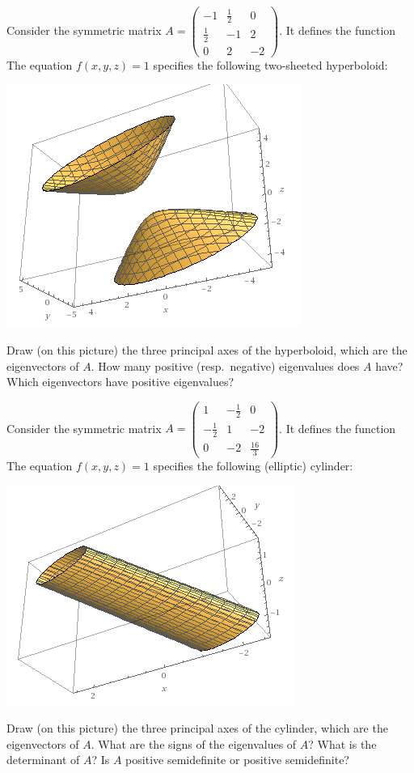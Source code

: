 \documentclass[10pt]{amsart}
\theoremstyle{mythm}
\theoremstyle{definition}
\theoremstyle{myrmk}
\begin{document}
	Consider the symmetric matrix $A = \begin{pmatrix}
	-1 & \frac12 & 0 \\
	\frac12 & -1 & 2 \\
	0 & 2 & -2
	\end{pmatrix}$. It defines the function 
	The equation $f(x, y, z) = 1$ specifies the following two-sheeted hyperboloid: 
	\begin{center}
		\includegraphics{rec10-pic6}
	\end{center}
	Draw (on this picture) the three principal axes of the hyperboloid, which are the eigenvectors of $A$. How many positive (resp.\ negative) eigenvalues does $A$ have? Which eigenvectors have positive eigenvalues? 
	
	Consider the symmetric matrix $A = \begin{pmatrix}
	1 & -\frac12 & 0 \\
	-\frac12 & 1 & -2 \\
	0 & -2 & \frac{16}{3}
	\end{pmatrix}$. It defines the function 
	The equation $f(x, y, z) = 1$ specifies the following (elliptic) cylinder: 
	\begin{center}
		\includegraphics{rec10-pic7}
	\end{center}
	Draw (on this picture) the three principal axes of the cylinder, which are the eigenvectors of $A$. What are the signs of the eigenvalues of $A$? What is the determinant of $A$? Is $A$ positive semidefinite or positive semidefinite? 
	
\end{document}
